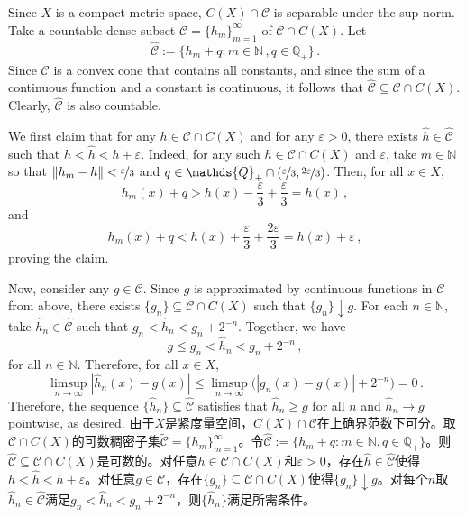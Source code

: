 \documentclass[12pt,letterpaper]{article}
\makeatletter
\newenvironment{original}{\color{black}}{}
\newenvironment{translation}{\color{blue}}{}
\theoremstyle{plain}
\theoremstyle{definition}
\renewenvironment{proof}[1][\proofname]{
  \par\pushQED{\qed}\normalfont
  \topsep6\p@\@plus6\p@\relax
  \trivlist\item[\hskip\labelsep\bfseries#1\@addpunct{.}]
  \ignorespaces
}{
  \popQED\endtrivlist\@endpefalse
}
\theoremstyle{remark}
\newcommand{\C}{\mathcal{C}}
\newcommand{\Q}{\mathds{Q}}
\newcommand{\N}{\mathds{N}}
\theoremstyle{definition}
\makeatother
\begin{document}
\begin{proof}
\begin{original}
Since $X$ is a compact metric space, $C(X)\cap \C$ is separable under the sup-norm. Take a countable dense subset $\widetilde{\C}=\{h_m\}_{m=1}^\infty$ of $\C \cap C(X)$. Let
\[
\widehat{\C}:=\{h_m+q: m \in \N\,, q \in \Q_+ \}\,.
\]
Since $\C$ is a convex cone that contains all constants, and since the sum of a continuous function and a constant is continuous, it follows that $\widehat{\C} \subseteq \C \cap C(X)$. Clearly, $\widehat{\C}$ is also countable.

We first claim that for any $h \in \C \cap C(X)$ and for any $\varepsilon>0$, there exists $\hat{h} \in \widehat{\C}$ such that $h < \hat{h} < h+\varepsilon$. Indeed, for any such $h \in \C \cap C(X)$ and $\varepsilon$, take $m \in \N$ so that $\|h_m-h\|<\nicefrac{\varepsilon}{3}$ and $q \in \Q_+ \cap (\nicefrac{\varepsilon}{3},\nicefrac{2\varepsilon}{3})$. Then, for all $x \in X$,
\[
h_m(x)+q > h(x)-\frac{\varepsilon}{3}+\frac{\varepsilon}{3}=h(x)\,,
\]
and
\[
h_m(x)+q < h(x)+\frac{\varepsilon}{3}+\frac{2\varepsilon}{3}=h(x)+\varepsilon\,,
\]
proving the claim.

Now, consider any $g \in \C$. Since $g$ is approximated by continuous functions in $\C$ from above, there exists $\{g_n\} \subseteq \C \cap C(X)$ such that $\{g_n\} \downarrow g$. For each $n \in \N$, take $\hat{h}_n \in \widehat{\C}$ such that $g_n<\hat{h}_n<g_n+2^{-n}$. Together, we have
\[
g \leq g_n<\hat{h}_n<g_n+2^{-n}\,,
\]
for all $n \in \N$. Therefore, for all $x \in X$,
\[
\limsup_{n \to \infty} |\hat{h}_n(x)-g(x)| \leq \limsup_{n \to \infty}\Big(|g_n(x)-g(x)|+2^{-n}\Big)=0\,.
\]
Therefore, the sequence $\{\hat{h}_n\} \subseteq \widehat{\C}$ satisfies that $\hat{h}_n \geq g$ for all $n$ and $\hat{h}_n \rightarrow g$ pointwise, as desired.
\end{original}
\begin{translation}
由于$X$是紧度量空间，$C(X)\cap \C$在上确界范数下可分。取$\C \cap C(X)$的可数稠密子集$\widetilde{\C}=\{h_m\}_{m=1}^\infty$。令$\widehat{\C}:=\{h_m+q: m \in \N, q \in \Q_+\}$。则$\widehat{\C} \subseteq \C \cap C(X)$是可数的。对任意$h \in \C \cap C(X)$和$\varepsilon>0$，存在$\hat{h} \in \widehat{\C}$使得$h < \hat{h} < h+\varepsilon$。对任意$g \in \C$，存在$\{g_n\} \subseteq \C \cap C(X)$使得$\{g_n\} \downarrow g$。对每个$n$取$\hat{h}_n \in \widehat{\C}$满足$g_n<\hat{h}_n<g_n+2^{-n}$，则$\{\hat{h}_n\}$满足所需条件。
\end{translation}
\end{proof}
\end{document}
